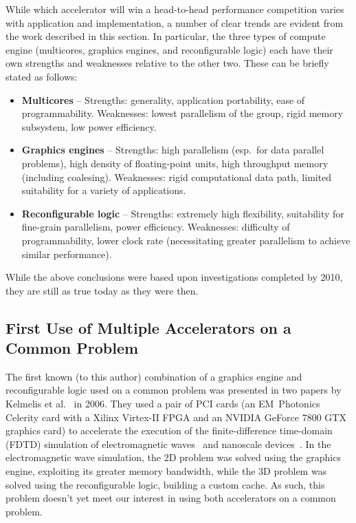 While which accelerator will win a head-to-head performance competition varies
with application and implementation, a number of clear trends are evident
from the work described in this section.  In particular, the three types
of compute engine (multicores, graphics engines, and reconfigurable logic)
each have their own strengths and weaknesses relative to the other two.
These can be briefly stated as follows:
\begin{itemize}
\item {\bf Multicores} -- Strengths: generality, application portability,
ease of programmability. Weaknesses: lowest parallelism of the group,
rigid memory subsystem, low power efficiency.
\item {\bf Graphics engines} -- Strengths: high parallelism (esp.~for data
parallel problems), high density of floating-point units, high throughput
memory (including coalesing). Weaknesses: rigid computational data path,
limited suitability for a variety of applications.
\item {\bf Reconfigurable logic} -- Strengths: extremely high flexibility,
suitability for fine-grain parallelism, power efficiency.  Weaknesses: 
difficulty of programmability, lower clock rate (necessitating greater
parallelism to achieve similar performance).
\end{itemize}

While the above conclusions were based upon investigations completed
by 2010, they are still as true today as they were then.

\subsection{First Use of Multiple Accelerators on a Common Problem}

The first known (to this author) combination of a graphics engine and
reconfigurable logic used on a common problem was presented
in two papers
by Kelmelis et al.~\cite{khdo06,kdh+06} in 2006.  They used a pair of PCI cards
(an EM~Photonics Celerity card with a Xilinx Virtex-II FPGA and
an NVIDIA GeForce 7800 GTX graphics card) to accelerate the execution of
the finite-difference time-domain (FDTD) simulation of electromagnetic
waves~\cite{khdo06} and nanoscale devices~\cite{kdh+06}.
In the electromagnetic wave simulation, the 2D problem was solved using
the graphics engine, exploiting its greater memory bandwidth, while the 3D
problem was solved using the reconfigurable logic, building a custom cache.
As such, this problem doesn't yet meet our interest in using both
accelerators on a common problem.

